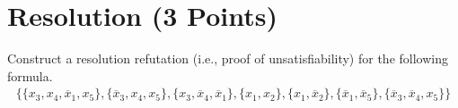 \documentclass[a4paper]{article}
\begin{document}
\section{Resolution (3 Points)}

Construct a resolution refutation (i.e., proof of unsatisfiability) for the following formula.
\vspace*{-1ex}
\begin{align*}
	\bigl\{
	\{x_{3}, x_{4}, \overline x_{1}, x_{5} \}, 
	\{\overline x_{3}, x_{4}, x_{5} \}, 
	\{x_{3}, \overline x_{4}, \overline x_{1} \}, 
	\{x_{1}, x_{2} \}, 
	\{x_{1}, \overline x_{2} \},  
	\{\overline x_{1}, \overline x_{5} \}, 
	\{\overline x_{3}, \overline x_{4}, x_{5}\}
	\bigr\}
\end{align*}
\end{document}
